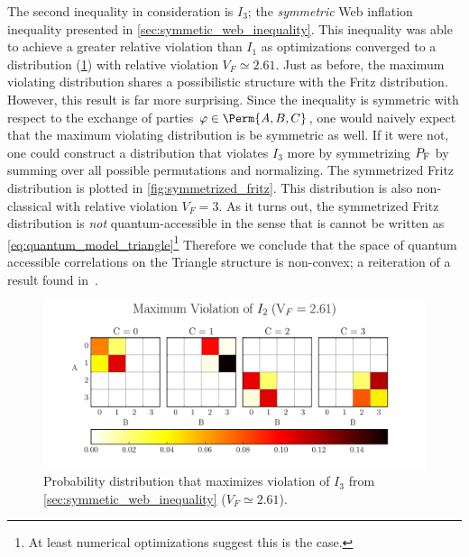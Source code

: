 \documentclass[aps, 10pt, english, twoside, pra, nofootinbib, tightenlines, longbibliography, superscriptaddress]{revtex4-1}
\begin{document}
    The second inequality in consideration is $I_3$; the \textit{symmetric} Web inflation inequality presented in \cref{sec:symmetic_web_inequality}. This inequality was able to achieve a greater relative violation than $I_1$ as optimizations converged to a distribution (\cref{fig:maximum_violation_I_3}) with relative violation $V_F \simeq 2.61$. Just as before, the maximum violating distribution shares a possibilistic structure with the Fritz distribution. However, this result is far more surprising. Since the inequality is symmetric with respect to the exchange of parties $\varphi \in \Perm{A, B, C}$, one would naively expect that the maximum violating distribution is be symmetric as well. If it were not, one could construct a distribution that violates $I_3$ more by symmetrizing $\prob[\fritz]$ by summing over all possible permutations and normalizing. The symmetrized Fritz distribution is plotted in \cref{fig:symmetrized_fritz}. This distribution is also non-classical with relative violation $V_F = 3$. As it turns out, the symmetrized Fritz distribution is \textit{not} quantum-accessible in the sense that is cannot be written as \cref{eq:quantum_model_triangle}\footnote{At least numerical optimizations suggest this is the case.} Therefore we conclude that the space of quantum accessible correlations on the Triangle structure is non-convex; a reiteration of a result found in~\citet{Inflation}.
    \begin{figure}
    \begin{center}
            \includegraphics[scale=0.6,trim={0 0 0 0.4in},clip]{../../figures/distributions/plotted_dist_I_3_max_violation_2017.pdf}
            \caption{Probability distribution that maximizes violation of $I_3$ from \cref{sec:symmetic_web_inequality} ($V_F \simeq 2.61$).}
            \label{fig:maximum_violation_I_3}
    \end{center}
    \end{figure}
\end{document}
